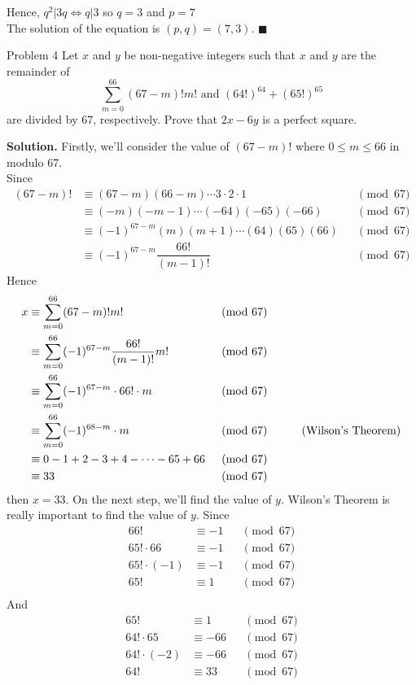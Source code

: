\documentclass[12pt]{article}
\begin{document}
Hence, $q^2 \vert 3q \Longleftrightarrow q \vert 3$ so $q=3$ and $p = 7$\\
The solution of the equation is $(p,q)=(7,3)$. \null\hfill $\blacksquare$
\newpage
\begin{mybox}{Problem 4}
Let $x$ and $y$ be non-negative integers such that $x$ and $y$  are the remainder of $$\displaystyle \sum^{66}_{m=0} (67-m)!m! \text{  and  }  (64!)^{64}+(65!)^{65}$$ are divided by $67$, respectively.  Prove that $2x-6y$ is a perfect square. 
\end{mybox}
\textbf{Solution.} Firstly, we'll consider the value of $(67-m)!$ where $0\leq m \leq 66$ in modulo $67$.\\ 
Since 
\begin{align*}
(67-m)! &\equiv (67-m)(66-m)\cdots3\cdot2\cdot1 &&\pmod {67}\\
&\equiv (-m)(-m-1)\cdots(-64)(-65)(-66) &&\pmod {67}\\
&\equiv (-1)^{67-m}(m)(m+1)\cdots(64)(65)(66) &&\pmod {67}\\
&\equiv (-1)^{67-m}\dfrac{66!}{(m-1)!} &&\pmod {67}
\end{align*}
Hence
\begin{align*}
x &\equiv \displaystyle \sum^{66}_{m=0} (67-m)!m! &&\pmod {67}\\
&\equiv \displaystyle \sum^{66}_{m=0} (-1)^{67-m}\dfrac{66!}{(m-1)!}m! &&\pmod {67}\\
&\equiv \displaystyle \sum^{66}_{m=0} (-1)^{67-m}\cdot66!\cdot m &&\pmod {67}\\
&\equiv \displaystyle \sum^{66}_{m=0} (-1)^{68-m}\cdot m &&\pmod {67} &\null\hfill \text{(Wilson's Theorem)}\\
&\equiv 0-1+2-3+4-\cdots-65+66 &&\pmod {67}\\
&\equiv33 &&\pmod{67}
\end{align*}
then $x=33$. On the next step, we'll find the value of $y$.
\newpage
Wilson's Theorem is really important to find the value of $y$. Since
\begin{align*}
66! & \equiv -1 &&\pmod {67}\\
65! \cdot 66 & \equiv -1 &&\pmod {67}\\
65! \cdot (-1) & \equiv -1 &&\pmod {67}\\
65!  & \equiv 1 &&\pmod {67}\\
\end{align*}
And 
\begin{align*}
65!  & \equiv 1 &&\pmod {67}\\
64! \cdot 65 &\equiv -66 &&\pmod {67}\\
64! \cdot (-2) &\equiv -66 &&\pmod {67}\\
64!  &\equiv 33 &&\pmod {67}\\
\end{align*}
\end{document}
